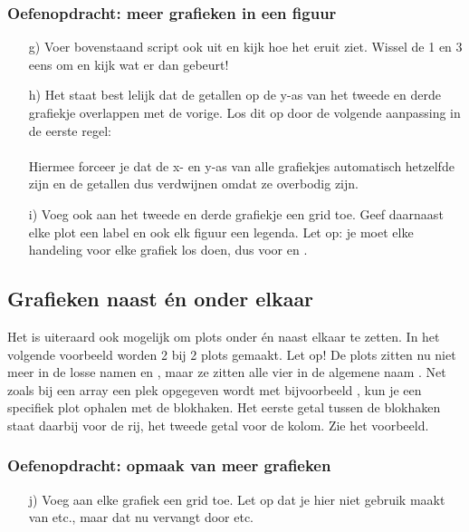 \documentclass[a4paper,11pt, fleqn]{article}
\begin{document}
\subsubsection*{Oefenopdracht: meer grafieken in een figuur}
\begin{itemize}
	\item[g)] Voer bovenstaand script ook uit en kijk hoe het eruit ziet. Wissel de 1 en 3 eens om en kijk wat er dan gebeurt!
	\item[h)] Het staat best lelijk dat de getallen op de y-as van het tweede en derde grafiekje overlappen met de vorige. Los dit op door de volgende aanpassing in de eerste regel:\\
	\\
	Hiermee forceer je dat de x- en y-as van alle grafiekjes automatisch hetzelfde zijn en de getallen dus verdwijnen omdat ze overbodig zijn.
	\item[i)] Voeg ook aan het tweede en derde grafiekje een grid toe. Geef daarnaast elke plot een label en ook elk figuur een legenda. Let op: je moet elke handeling voor elke grafiek los doen, dus voor  en .
\end{itemize}

\subsection{Grafieken naast \'en onder elkaar}
Het is uiteraard ook mogelijk om plots onder \'en naast elkaar te zetten. In het volgende voorbeeld worden 2 bij 2 plots gemaakt. Let op! De plots zitten nu niet meer in de losse namen  en , maar ze zitten alle vier in de algemene naam . Net zoals bij een array een plek opgegeven wordt met bijvoorbeeld \pythoninline{[1]}, kun je een specifiek plot ophalen met de blokhaken. Het eerste getal tussen de blokhaken staat daarbij voor de rij, het tweede getal voor de kolom. Zie het voorbeeld.


\subsubsection*{Oefenopdracht: opmaak van meer grafieken}
\begin{itemize}
	\item[j)] Voeg aan elke grafiek een grid toe. Let op dat je hier niet gebruik maakt van  etc., maar dat nu vervangt door  etc.
\end{itemize}
\end{document}
